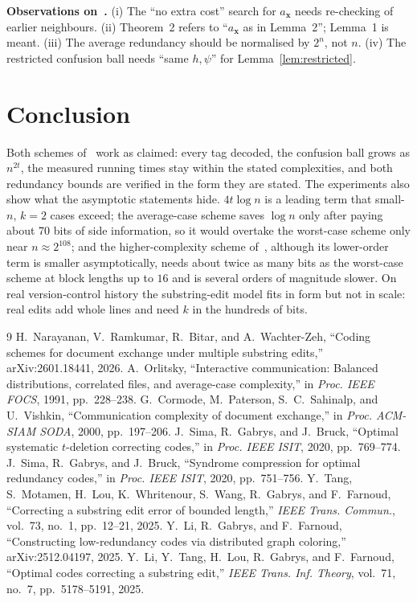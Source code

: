 \documentclass[journal,10pt]{IEEEtran}
\newcommand{\bx}{\mathbf{x}}
\begin{document}
\textbf{Observations on~\cite{narayanan}.} (i) The ``no extra cost'' search for $a_{\bx}$ needs re-checking of earlier neighbours. (ii) Theorem~2 refers to ``$a_{\bx}$ as in Lemma~2''; Lemma~1 is meant. (iii) The average redundancy should be normalised by $2^n$, not $n$. (iv) The restricted confusion ball needs ``same $h,\psi$'' for Lemma~\ref{lem:restricted}.

\section{Conclusion}
Both schemes of~\cite{narayanan} work as claimed: every tag decoded, the confusion ball grows as $n^{2t}$, the measured running times stay within the stated complexities, and both redundancy bounds are verified in the form they are stated. The experiments also show what the asymptotic statements hide. $4t\log n$ is a leading term that small-$n$, $k=2$ cases exceed; the average-case scheme saves $\log n$ only after paying about 70 bits of side information, so it would overtake the worst-case scheme only near $n\approx2^{108}$; and the higher-complexity scheme of~\cite{li21}, although its lower-order term is smaller asymptotically, needs about twice as many bits as the worst-case scheme at block lengths up to $16$ and is several orders of magnitude slower. On real version-control history the substring-edit model fits in form but not in scale: real edits add whole lines and need $k$ in the hundreds of bits.

\begin{thebibliography}{9}
 H.~Narayanan, V.~Ramkumar, R.~Bitar, and A.~Wachter-Zeh, ``Coding schemes for document exchange under multiple substring edits,'' arXiv:2601.18441, 2026.
 A.~Orlitsky, ``Interactive communication: Balanced distributions, correlated files, and average-case complexity,'' in \emph{Proc. IEEE FOCS}, 1991, pp.~228--238.
 G.~Cormode, M.~Paterson, S.~C.~Sahinalp, and U.~Vishkin, ``Communication complexity of document exchange,'' in \emph{Proc. ACM-SIAM SODA}, 2000, pp.~197--206.
 J.~Sima, R.~Gabrys, and J.~Bruck, ``Optimal systematic $t$-deletion correcting codes,'' in \emph{Proc. IEEE ISIT}, 2020, pp.~769--774.
 J.~Sima, R.~Gabrys, and J.~Bruck, ``Syndrome compression for optimal redundancy codes,'' in \emph{Proc. IEEE ISIT}, 2020, pp.~751--756.
 Y.~Tang, S.~Motamen, H.~Lou, K.~Whritenour, S.~Wang, R.~Gabrys, and F.~Farnoud, ``Correcting a substring edit error of bounded length,'' \emph{IEEE Trans. Commun.}, vol.~73, no.~1, pp.~12--21, 2025.
 Y.~Li, R.~Gabrys, and F.~Farnoud, ``Constructing low-redundancy codes via distributed graph coloring,'' arXiv:2512.04197, 2025.
 Y.~Li, Y.~Tang, H.~Lou, R.~Gabrys, and F.~Farnoud, ``Optimal codes correcting a substring edit,'' \emph{IEEE Trans. Inf. Theory}, vol.~71, no.~7, pp.~5178--5191, 2025.
\end{thebibliography}
\end{document}
